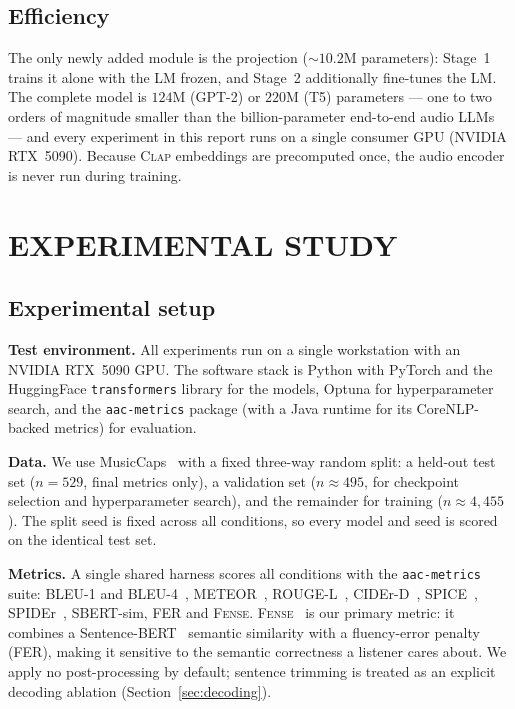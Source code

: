 \documentclass[9pt]{report}
\newcommand{\fense}{\textsc{Fense}}
\newcommand{\clapenc}{\textsc{Clap}}
\begin{document}
\section{Efficiency}
The only newly added module is the projection ($\sim$$10.2$M parameters): Stage~1 trains it
alone with the LM frozen, and Stage~2 additionally fine-tunes the LM. The complete model is
$124$M (GPT-2) or $220$M (T5) parameters --- one to two orders of magnitude smaller than the
billion-parameter end-to-end audio LLMs --- and every experiment in this report runs on a
single consumer GPU (NVIDIA RTX~5090). Because \clapenc{} embeddings are precomputed once,
the audio encoder is never run during training.

\chapter{EXPERIMENTAL STUDY}\label{ch:experiments}

\section{Experimental setup}

\textbf{Test environment.}
All experiments run on a single workstation with an NVIDIA RTX~5090 GPU. The software stack is
Python with PyTorch and the HuggingFace \texttt{transformers} library for the models, Optuna
for hyperparameter search, and the \texttt{aac-metrics} package (with a Java runtime for its
CoreNLP-backed metrics) for evaluation.

\textbf{Data.}
We use MusicCaps~\cite{agostinelli2023musiclm} with a fixed three-way random split: a held-out
test set ($n{=}529$, final metrics only), a validation set ($n{\approx}495$, for checkpoint
selection and hyperparameter search), and the remainder for training ($n{\approx}4{,}455$). The
split seed is fixed across all conditions, so every model and seed is scored on the identical
test set.

\textbf{Metrics.}
A single shared harness scores all conditions with the \texttt{aac-metrics} suite: BLEU-1 and
BLEU-4~\cite{papineni2002bleu}, METEOR~\cite{banerjee2005meteor}, ROUGE-L~\cite{lin2004rouge},
CIDEr-D~\cite{vedantam2015cider}, SPICE~\cite{anderson2016spice}, SPIDEr~\cite{liu2017spider},
SBERT-sim, FER and \fense{}.
\fense{}~\cite{zhou2022fense} is our primary metric: it combines a
Sentence-BERT~\cite{reimers2019sbert} semantic similarity with a fluency-error penalty (FER),
making it sensitive to the semantic correctness a listener cares about. We apply no
post-processing by default; sentence trimming is treated as an explicit decoding ablation
(Section~\ref{sec:decoding}).
\end{document}
